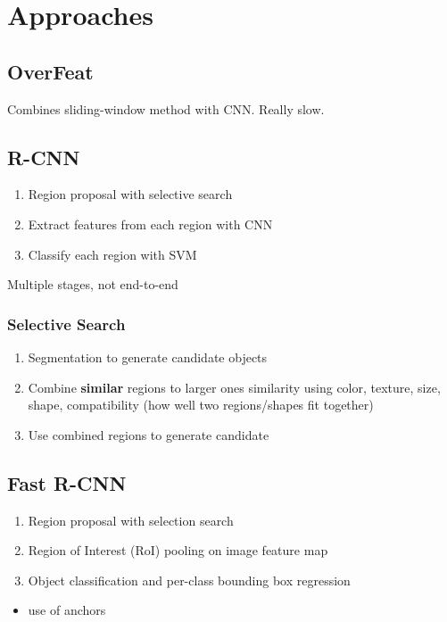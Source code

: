 \documentclass[12pt]{article}
\begin{document}
	\section*{Approaches}
	\subsection*{OverFeat}
	Combines sliding-window method with CNN. Really slow.
	
	\subsection*{R-CNN}
	\begin{enumerate}
		\item Region proposal with selective search
		\item Extract features from each region with CNN
		\item Classify each region with SVM
	\end{enumerate}
	
	Multiple stages, not end-to-end
	
	\subsubsection*{Selective Search}
	\begin{enumerate}
		\item Segmentation to generate candidate objects
		\item Combine \textbf{similar} regions to larger ones
		\subitem * similarity using color, texture, size, shape, compatibility (how well two regions/shapes fit together)
		\item Use combined regions to generate candidate 
	\end{enumerate}
	
	\subsection*{Fast R-CNN}
	\begin{enumerate}
		\item Region proposal with selection search
		\item Region of Interest (RoI) pooling on image feature map
		\item Object classification and per-class bounding box regression
	\end{enumerate}

	\begin{itemize}
		\item use of anchors
	\end{itemize}
\end{document}
